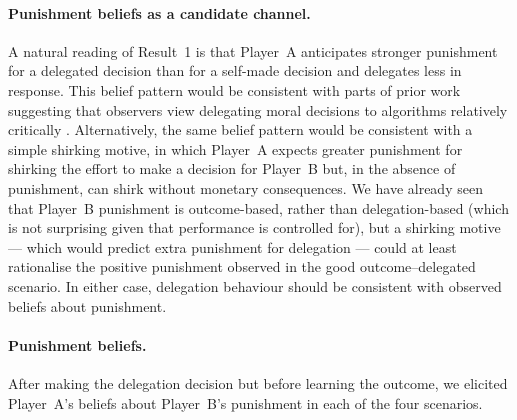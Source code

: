 %
%

\paragraph{Punishment beliefs as a candidate channel.} A natural reading of Result~1 is that Player~A anticipates stronger punishment for a delegated decision than for a self-made decision and delegates less in response. This belief pattern would be consistent with parts of prior work suggesting that observers view delegating moral decisions to algorithms relatively critically \citep[e.g.,][]{gogoll_rage_2018, niszczota_robo-investors_2020, jauernig_people_2022}. Alternatively, the same belief pattern would be consistent with a simple shirking motive, in which Player~A expects greater punishment for shirking the effort to make a decision for Player~B but, in the absence of punishment, can shirk without monetary consequences. We have already seen that Player~B punishment is outcome-based, rather than delegation-based (which is not surprising given that performance is controlled for), but a shirking motive --- which would predict extra punishment for delegation --- could at least rationalise the positive punishment observed in the good outcome--delegated scenario. In either case, delegation behaviour should be consistent with observed beliefs about punishment.

\paragraph{Punishment beliefs.} \label{sec:beliefs} After making the delegation decision but before learning the outcome, we elicited Player~A's beliefs about Player~B's punishment in each of the four scenarios.

